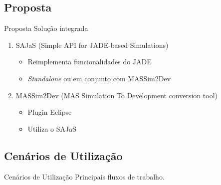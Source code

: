 
\subsection{Proposta}
\begin{frame}{Proposta}
	Solução integrada
	\begin{enumerate}
		\item SAJaS (Simple API for JADE-based Simulations)
		\begin{itemize}
			\item Reimplementa funcionalidades do JADE
			\item \emph{Standalone} ou em conjunto com MASSim2Dev
		\end{itemize}
		\item MASSim2Dev (MAS Simulation To Development conversion tool)
		\begin{itemize}
			\item Plugin Eclipse
			\item Utiliza o SAJaS
		\end{itemize}
	\end{enumerate}
\end{frame}

\subsection{Cenários de Utilização}
\begin{frame}{Cenários de Utilização}
	Principais fluxos de trabalho.

\end{frame}
